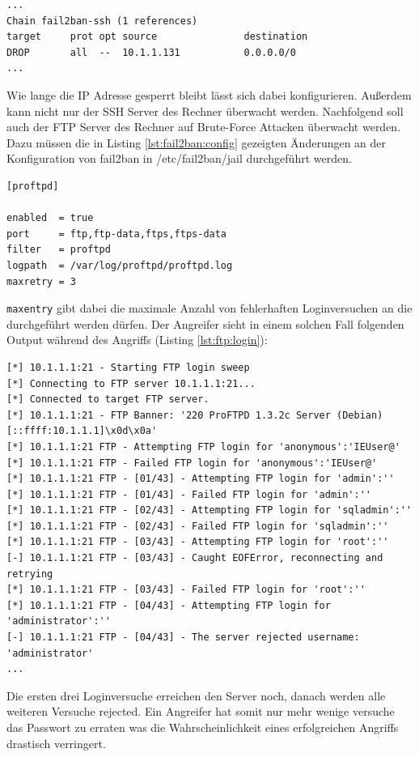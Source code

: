 \documentclass[a4paper,12pt]{article} %
\begin{document}
\begin{lstlisting}[style=code,caption={iptables des Rechners},label=lst:ssh:iptables]
...
Chain fail2ban-ssh (1 references)
target     prot opt source               destination
DROP       all  --  10.1.1.131           0.0.0.0/0
...
\end{lstlisting}
Wie lange die IP Adresse gesperrt bleibt lässt sich dabei konfigurieren. Außerdem kann nicht nur der SSH Server des Rechner überwacht werden. Nachfolgend soll auch der FTP Server des Rechner auf Brute-Force Attacken überwacht werden. Dazu müssen die in Listing \ref{lst:fail2ban:config} gezeigten Änderungen an der Konfiguration von fail2ban in /etc/fail2ban/jail durchgeführt werden.

\begin{lstlisting}[style=code,caption={fail2ban Konfiguration (Auzug)},label=lst:fail2ban:config]
[proftpd]

enabled  = true
port     = ftp,ftp-data,ftps,ftps-data
filter   = proftpd
logpath  = /var/log/proftpd/proftpd.log
maxretry = 3
\end{lstlisting}
\verb!maxentry! gibt dabei die maximale Anzahl von fehlerhaften Loginversuchen an die durchgeführt werden dürfen.
Der Angreifer sieht in einem solchen Fall folgenden Output während des Angriffs (Listing \ref{lst:ftp:login}):
\begin{lstlisting}[style=code,caption={Brute-Force auf FTP},label=lst:ftp:login]
[*] 10.1.1.1:21 - Starting FTP login sweep
[*] Connecting to FTP server 10.1.1.1:21...
[*] Connected to target FTP server.
[*] 10.1.1.1:21 - FTP Banner: '220 ProFTPD 1.3.2c Server (Debian) [::ffff:10.1.1.1]\x0d\x0a'
[*] 10.1.1.1:21 FTP - Attempting FTP login for 'anonymous':'IEUser@'
[*] 10.1.1.1:21 FTP - Failed FTP login for 'anonymous':'IEUser@'
[*] 10.1.1.1:21 FTP - [01/43] - Attempting FTP login for 'admin':''
[*] 10.1.1.1:21 FTP - [01/43] - Failed FTP login for 'admin':''
[*] 10.1.1.1:21 FTP - [02/43] - Attempting FTP login for 'sqladmin':''
[*] 10.1.1.1:21 FTP - [02/43] - Failed FTP login for 'sqladmin':''
[*] 10.1.1.1:21 FTP - [03/43] - Attempting FTP login for 'root':''
[-] 10.1.1.1:21 FTP - [03/43] - Caught EOFError, reconnecting and retrying
[*] 10.1.1.1:21 FTP - [03/43] - Failed FTP login for 'root':''
[*] 10.1.1.1:21 FTP - [04/43] - Attempting FTP login for 'administrator':''
[-] 10.1.1.1:21 FTP - [04/43] - The server rejected username: 'administrator'
...
\end{lstlisting}
Die ersten drei Loginversuche erreichen den Server noch, danach werden alle weiteren Versuche rejected. Ein Angreifer hat somit nur mehr wenige versuche das Passwort zu erraten was die Wahrscheinlichkeit eines erfolgreichen Angriffs drastisch verringert.
\end{document}
